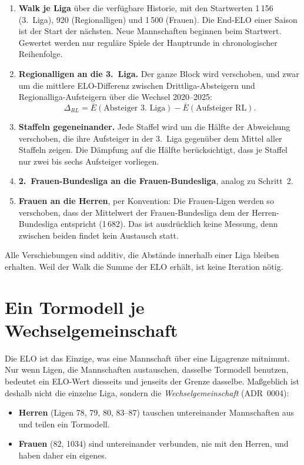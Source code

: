 \begin{enumerate}
  \item \textbf{Walk je Liga} über die verfügbare Historie, mit den
        Startwerten 1\,156 (3.~Liga), 920 (Regionalligen) und 1\,500 (Frauen).
        Die End-ELO einer Saison ist der Start der nächsten. Neue Mannschaften
        beginnen beim Startwert. Gewertet werden nur reguläre Spiele der
        Hauptrunde in chronologischer Reihenfolge.
  \item \textbf{Regionalligen an die 3.~Liga.} Der ganze Block wird
        verschoben, und zwar um die mittlere ELO-Differenz zwischen
        Drittliga-Absteigern und Regionalliga-Aufsteigern über die Wechsel
        2020--2025:
        \[
          \Delta_{RL} = \overline{E}(\text{Absteiger 3.~Liga}) - \overline{E}(\text{Aufsteiger RL}).
        \]
  \item \textbf{Staffeln gegeneinander.} Jede Staffel wird um die Hälfte der
        Abweichung verschoben, die ihre Aufsteiger in der 3.~Liga gegenüber
        dem Mittel aller Staffeln zeigen. Die Dämpfung auf die Hälfte
        berücksichtigt, dass je Staffel nur zwei bis sechs Aufsteiger
        vorliegen.
  \item \textbf{2.~Frauen-Bundesliga an die Frauen-Bundesliga}, analog zu
        Schritt~2.
  \item \textbf{Frauen an die Herren}, per Konvention: Die Frauen-Ligen werden
        so verschoben, dass der Mittelwert der Frauen-Bundesliga dem der
        Herren-Bundesliga entspricht (1\,682). Das ist ausdrücklich keine
        Messung, denn zwischen beiden findet kein Austausch statt.
\end{enumerate}

Alle Verschiebungen sind additiv, die Abstände innerhalb einer Liga bleiben
erhalten. Weil der Walk die Summe der ELO erhält, ist keine Iteration nötig.

\section{Ein Tormodell je Wechselgemeinschaft}\label{sec:wechselgemeinschaft}

Die ELO ist das Einzige, was eine Mannschaft über eine Ligagrenze mitnimmt.
Nur wenn Ligen, die Mannschaften austauschen, dasselbe Tormodell benutzen,
bedeutet ein ELO-Wert diesseits und jenseits der Grenze dasselbe. Maßgeblich
ist deshalb nicht die einzelne Liga, sondern die \emph{Wechselgemeinschaft}
(ADR~0004):

\begin{itemize}
  \item \textbf{Herren} (Ligen 78, 79, 80, 83--87) tauschen untereinander
        Mannschaften aus und teilen ein Tormodell.
  \item \textbf{Frauen} (82, 1034) sind untereinander verbunden, nie mit den
        Herren, und haben daher ein eigenes.
\end{itemize}

